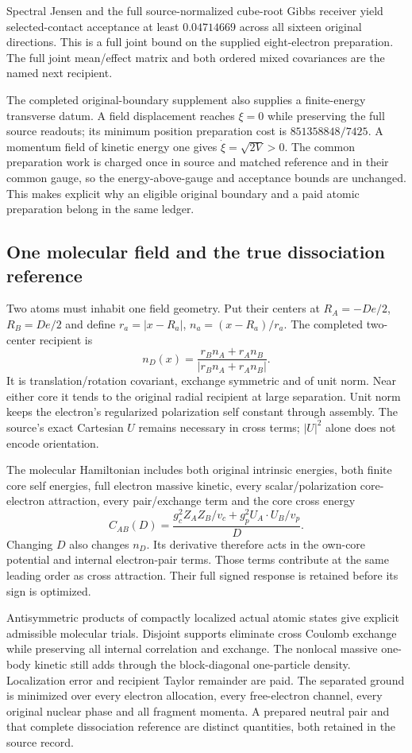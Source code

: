 Spectral Jensen and the full source-normalized cube-root Gibbs receiver yield selected-contact acceptance at least $0.04714669$ across all sixteen original directions. This is a full joint bound on the supplied eight-electron preparation. The full joint mean/effect matrix and both ordered mixed covariances are the named next recipient.

The completed original-boundary supplement also supplies a finite-energy transverse datum. A field displacement reaches $\xi=0$ while preserving the full source readouts; its minimum position preparation cost is $851358848/7425$. A momentum field of kinetic energy one gives $\dot\xi=\sqrt{2V}>0$. The common preparation work is charged once in source and matched reference and in their common gauge, so the energy-above-gauge and acceptance bounds are unchanged. This makes explicit why an eligible original boundary and a paid atomic preparation belong in the same ledger.

\subsection{One molecular field and the true dissociation reference}

Two atoms must inhabit one field geometry. Put their centers at $R_A=-De/2$, $R_B=De/2$ and define $r_a=|x-R_a|$, $n_a=(x-R_a)/r_a$. The completed two-center recipient is
\[
 n_D(x)=\frac{r_Bn_A+r_An_B}{|r_Bn_A+r_An_B|}.
\]
It is translation/rotation covariant, exchange symmetric and of unit norm. Near either core it tends to the original radial recipient at large separation. Unit norm keeps the electron's regularized polarization self constant through assembly. The source's exact Cartesian $U$ remains necessary in cross terms; $|U|^2$ alone does not encode orientation. 

The molecular Hamiltonian includes both original intrinsic energies, both finite core self energies, full electron massive kinetic, every scalar/polarization core-electron attraction, every pair/exchange term and the core cross energy
\[
 C_{AB}(D)=\frac{g_c^2Z_AZ_B/v_c+g_p^2U_A\cdot U_B/v_p}{D}.
\]
Changing $D$ also changes $n_D$. Its derivative therefore acts in the own-core potential and internal electron-pair terms. Those terms contribute at the same leading order as cross attraction. Their full signed response is retained before its sign is optimized.

Antisymmetric products of compactly localized actual atomic states give explicit admissible molecular trials. Disjoint supports eliminate cross Coulomb exchange while preserving all internal correlation and exchange. The nonlocal massive one-body kinetic still adds through the block-diagonal one-particle density. Localization error and recipient Taylor remainder are paid. The separated ground is minimized over every electron allocation, every free-electron channel, every original nuclear phase and all fragment momenta. A prepared neutral pair and that complete dissociation reference are distinct quantities, both retained in the source record.

